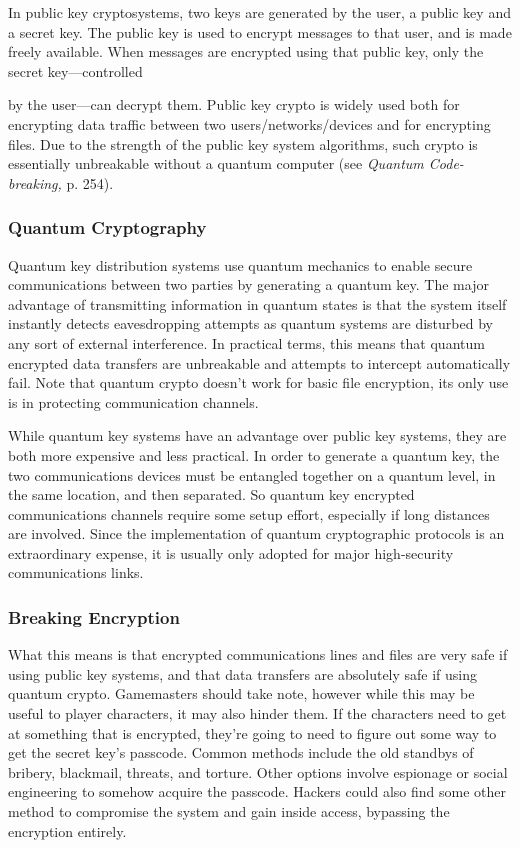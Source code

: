 In public key cryptosystems, two keys are generated by the user, a public key and a secret key. The public key is used to encrypt messages to that user, and is made freely available. When messages are encrypted using that public key, only the secret key—controlled 

by the user—can decrypt them. Public key crypto is widely used both for encrypting data traffic between two users/networks/devices and for encrypting files. Due to the strength of the public key system algorithms, such crypto is essentially unbreakable without a quantum computer (see \textit{Quantum Code-} \textit{breaking,} p. 254). 

\subsubsection{Quantum Cryptography} 

Quantum key distribution systems use quantum mechanics to enable secure communications between two parties by generating a quantum key. The major advantage of transmitting information in quantum states is that the system itself instantly detects eavesdropping attempts as quantum systems are disturbed by any sort of external interference. In practical terms, this means that quantum encrypted data transfers are unbreakable and attempts to intercept automatically fail. Note that quantum crypto doesn't work for basic file encryption, its only use is in protecting communication channels. 

While quantum key systems have an advantage over public key systems, they are both more expensive and less practical. In order to generate a quantum key, the two communications devices must be entangled together on a quantum level, in the same location, and then separated. So quantum key encrypted communications channels require some setup effort, especially if long distances are involved. Since the implementation of quantum cryptographic protocols is an extraordinary expense, it is usually only adopted for major high-security communications links. 

\subsubsection{Breaking Encryption} 

What this means is that encrypted communications lines and files are very safe if using public key systems, and that data transfers are absolutely safe if using quantum crypto. Gamemasters should take note, however while this may be useful to player characters, it may also hinder them. If the characters need to get at something that is encrypted, they're going to need to figure out some way to get the secret key's passcode. Common methods include the old standbys of bribery, blackmail, threats, and torture. Other options involve espionage or social engineering to somehow acquire the passcode. Hackers could also find some other method to compromise the system and gain inside access, bypassing the encryption entirely. 

